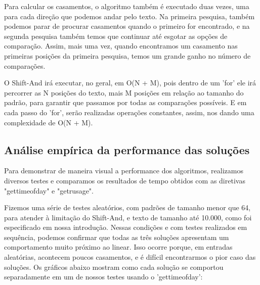 \documentclass[12pt]{article}
\begin{document}
            Para calcular os casamentos, o algoritmo também é executado duas vezes, uma para cada direção que podemos andar pelo texto. 
            Na primeira pesquisa, também podemos parar de procurar casamentos quando o primeiro for encontrado, e na segunda pesquisa também 
            temos que continuar até esgotar as opções de comparação. Assim, mais uma vez, quando encontramos um casamento nas primeiras 
            posições da primeira pesquisa, temos um grande ganho no número de comparações.
            
            O Shift-And irá executar, no geral, em O(N + M), pois dentro de um 'for' ele irá percorrer as N posições do texto, mais M posições 
            em relação ao tamanho do padrão, para garantir que passamos por todas as comparações possíveis. E em cada passo do 'for', serão 
            realizadas operações constantes, assim, nos dando uma complexidade de O(N + M).
        
        \subsection{Análise empírica da performance das soluções}
            Para demonstrar de maneira visual a performance dos algoritmos, realizamos diversos testes e comparamos os resultados de tempo 
            obtidos com as diretivas "gettimeofday" e "getrusage".

            Fizemos uma série de testes aleatórios, com padrões de tamanho menor que 64, para atender à limitação do Shift-And, e texto de 
            tamanho até 10.000, como foi especificado em nossa introdução. Nessas condições e com testes realizados em sequência, podemos 
            confirmar que todas as três soluções apresentam um comportamento muito próximo ao linear. Isso ocorre porque, em entradas 
            aleatórias, acontecem poucos casamentos, e é difícil encontrarmos o pior caso das soluções. Os gráficos abaixo mostram como cada 
            solução se comportou separadamente em um de nossos testes usando o 'gettimeofday':
\end{document}
